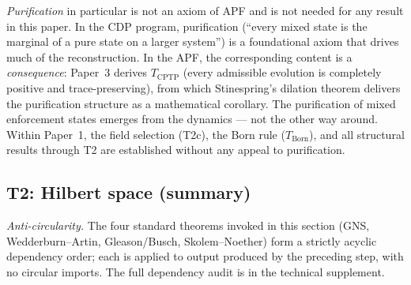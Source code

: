 \documentclass[11pt]{article}
\theoremstyle{remark}
\begin{document}
\textit{Purification} in particular is not an axiom of APF and is not needed for any result in this paper.  In the CDP program, purification (``every mixed state is the marginal of a pure state on a larger system'') is a foundational axiom that drives much of the reconstruction.  In the APF, the corresponding content is a \emph{consequence}: Paper~3 derives $T_{\mathrm{CPTP}}$ (every admissible evolution is completely positive and trace-preserving), from which Stinespring's dilation theorem delivers the purification structure as a mathematical corollary.  The purification of mixed enforcement states emerges from the dynamics --- not the other way around.  Within Paper~1, the field selection (T2c), the Born rule ($T_{\mathrm{Born}}$), and all structural results through T2 are established without any appeal to purification.

\subsection{T2: Hilbert space (summary)}
\label{sec:T2}

\smallskip\noindent\textit{Anti-circularity.}  The four standard theorems invoked in this section (GNS, Wedderburn--Artin, Gleason/Busch, Skolem--Noether) form a strictly acyclic dependency order; each is applied to output produced by the preceding step, with no circular imports.  The full dependency audit is in the technical supplement.
\end{document}
